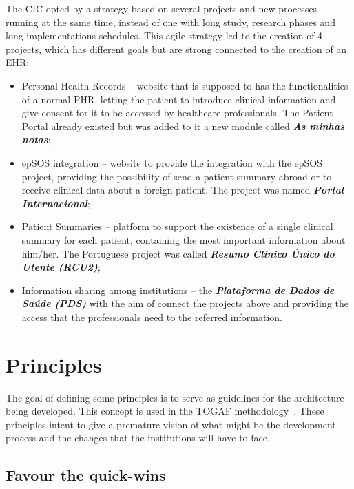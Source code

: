 The CIC opted by a strategy based on several projects and new processes running at the same time, instead of one with long study, research phases and long implementations schedules. This agile strategy led to the creation of 4 projects, which has different goals but are strong connected to the creation of an EHR:

\begin{itemize}
\item Personal Health Records -- website that is supposed to has the functionalities of a normal PHR, letting the patient to introduce clinical information and give consent for it to be accessed by healthcare professionals. The Patient Portal already existed but was added to it a new module called \textit{\textbf{As minhas notas}}; 
\item epSOS integration -- website to provide the integration with the epSOS project, providing the possibility of send a patient summary abroad or to receive clinical data about a foreign patient. The project was named \textit{\textbf{Portal Internacional}};
\item Patient Summaries -- platform to support the existence of a single clinical summary for each patient, containing the most important information about him/her. The Portuguese project was called \textbf{\textit{Resumo Clínico Único do Utente (RCU2)}};
\item Information sharing among institutions -- the \textbf{\textit{Plataforma de Dados de Saúde (PDS)}} with the aim of connect the projects above and providing the access that the professionals need to the referred information.
\end{itemize}



\section{Principles}

The goal of defining some principles is to serve as guidelines for the architecture being developed. This concept is used in the TOGAF methodology~\citep{Josey2009, Josey2011}. These principles intent to give a premature vision of what might be the development process and the changes that the institutions will have to face.


\subsection{Favour the quick-wins}

